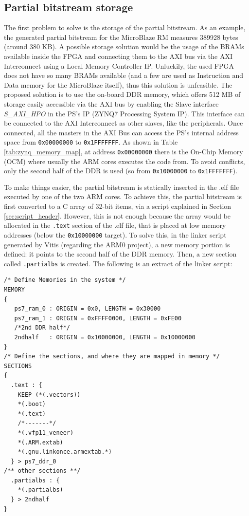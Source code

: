 \subsection{Partial bitstream storage}
The first problem to solve is the storage of the partial bitstream. As an example, the generated partial bitstream for the MicroBlaze RM measures 389928 bytes (around 380 KB). A possible storage solution would be the usage of the BRAMs available inside the FPGA and connecting them to the AXI bus via the AXI Interconnect using a Local Memory Controller IP. Unluckily, the used FPGA does not have so many BRAMs available (and a few are used as Instruction and Data memory for the MicroBlaze itself), thus this solution is unfeasible. The proposed solution is to use the on-board DDR memory, which offers 512 MB of storage easily accessible via the AXI bus by enabling the Slave interface \textit{S\_AXI\_HPO} in the PS's IP (ZYNQ7 Processing System IP). This interface can be connected to the AXI Interconnect as other slaves, like the peripherals. Once connected, all the masters in the AXI Bus can access the PS's internal address space from \texttt{0x00000000} to \texttt{0x1FFFFFFF}. As shown in Table \ref{tab:zynq_memory_map}, at address \texttt{0x00000000} there is the On-Chip Memory (OCM) where usually the ARM cores executes the code from. To avoid conflicts, only the second half of the DDR is used (so from \texttt{0x10000000} to \texttt{0x1FFFFFFF}). \bigskip

To make things easier, the partial bitstream is statically inserted in the .elf file executed by one of the two ARM cores. To achieve this, the partial bitstream is first converted to a C array of 32-bit items, via a script explained in Section \ref{sec:script_header}. However, this is not enough because the array would be allocated in the \texttt{.text} section of the .elf file, that is placed at low memory addresses (below the \texttt{0x10000000} target). To solve this, in the linker script generated by Vitis (regarding the ARM0 project), a new memory portion is defined: it points to the second half of the DDR memory. Then, a new section called \texttt{.partialbs} is created. The following is an extract of the linker script:\bigskip

\begin{lstlisting}[style=preformatted]
/* Define Memories in the system */
MEMORY
{
   ps7_ram_0 : ORIGIN = 0x0, LENGTH = 0x30000
   ps7_ram_1 : ORIGIN = 0xFFFF0000, LENGTH = 0xFE00
   /*2nd DDR half*/
   2ndhalf	 : ORIGIN = 0x10000000, LENGTH = 0x10000000 
}
/* Define the sections, and where they are mapped in memory */
SECTIONS
{
  .text : {
    KEEP (*(.vectors))
    *(.boot)
    *(.text)
    /*-------*/
    *(.vfp11_veneer)
    *(.ARM.extab)
    *(.gnu.linkonce.armextab.*)
  } > ps7_ddr_0
/** other sections **/
  .partialbs : {
    *(.partialbs)
  } > 2ndhalf
}
\end{lstlisting}

